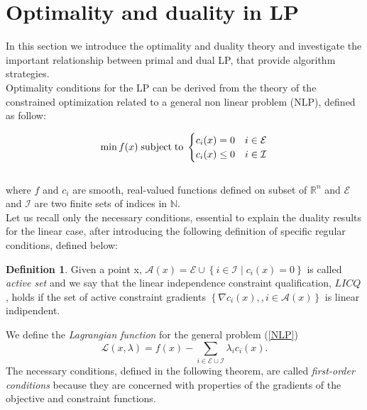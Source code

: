 \documentclass[a4paper,10 pt,titlepage,twoside]{book}
\theoremstyle{plain}
\theoremstyle{definition}
\newtheorem{defn}[thm]{Definition}
\newtheorem{ex}[thm]{Example}
\theoremstyle{remark}
\begin{document}

\section{Optimality and duality in LP}
In this section we introduce the optimality and duality theory and investigate the important relationship between primal and dual LP, that provide algorithm strategies.\\ 
Optimality conditions for the LP can be derived from the theory of the constrained optimization related to a general non linear problem (NLP), defined as follow:

\begin{equation}\label{NLP}
\min f(x)\text{\;subject\;to\;}\begin{cases} c_{i}(x) = 0 &i \in \mathcal{E}\\ c_{i}(x)\leq 0 &i\in \mathcal{I}\end{cases}
\end{equation}
\\
where $f$ and $c_{i}$ are smooth, real-valued functions defined on subset of $\mathbb{R}^{n}$ and $\mathcal{E}$ and $\mathcal{I}$ are two finite sets of indices in $\mathbb{N}$.\\Let us recall only the necessary conditions, essential to explain the duality results for the linear case, after introducing the following definition of specific regular conditions, defined below:
\begin{defn}
	Given a point x, $\mathcal{A}(x)= \mathcal{E}\cup\left\lbrace i\in\mathcal{I}\;|\;c_{i}(x) =0\right\rbrace$ is called \textit{active set} and we say that the linear independence constraint qualification, $LICQ$, holds if the set of active constraint gradients $\left\lbrace \nabla c_{i}(x),,i\in\mathcal{A}(x)\right\rbrace$ is linear indipendent.
\end{defn}
We define the \textit{Lagrangian function} for the general problem (\ref{NLP}) 
\begin{equation*}
\mathcal{L}\left(x,\lambda\right)=f(x)-\sum_{i\in\mathcal{E}\cup\mathcal{I}}\lambda_{i}c_{i}(x).
\end{equation*}
The necessary conditions, defined in the following theorem, are called \textit{first-order conditions} because they are concerned with properties of the gradients of the objective and constraint functions.
\end{document}
